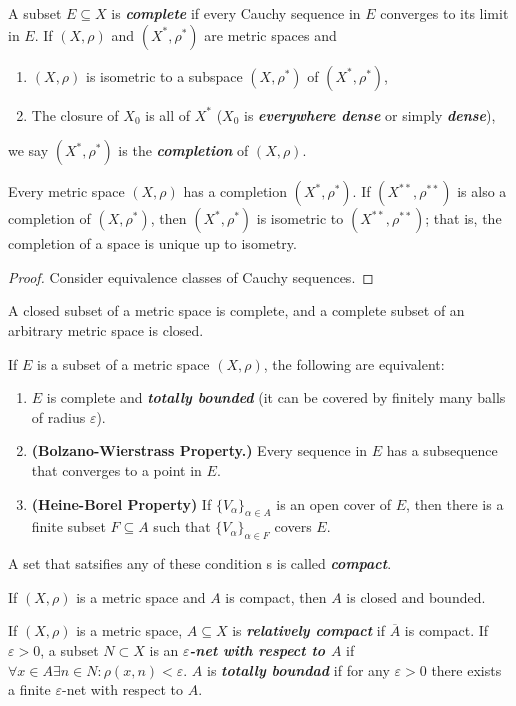 \documentclass{article}
\theoremstyle{definition}
\begin{document}
	A subset $E\subseteq X$ is \textbf{\textit{complete}} if every Cauchy sequence in $E$ converges to its limit in $E$. If $(X,\rho)$ and $(X^*,\rho^*)$ are metric spaces and
	\begin{enumerate}
		\item $(X,\rho)$ is isometric to a subspace $(X,\rho^*)$ of $(X^*,\rho^*)$,
		\item The closure of $X_0$ is all of $X^*$ ($X_0$ is \textbf{\textit{everywhere dense}} or simply \textbf{\textit{dense}}),
	\end{enumerate}
	we say $(X^*,\rho^*)$ is the \textbf{\textit{completion}} of $(X,\rho)$.
	\begin{thm}
		Every metric space $(X,\rho)$ has a completion $(X^*,\rho^*)$. If $(X^{**},\rho^{**})$ is also a completion of $(X,\rho^*)$, then $(X^*,\rho^*)$ is isometric to $(X^{**},\rho^{**})$; that is, the completion of a space is unique up to isometry.
	\end{thm}
	\begin{proof}
		Consider equivalence classes of Cauchy sequences.
	\end{proof}
	
	\begin{prop}
		A closed subset of a metric space is complete, and a complete subset of an arbitrary metric space is closed.
	\end{prop}
	
	\begin{thm}
		If $E$ is a subset of a metric space $(X,\rho)$, the following are equivalent:
		\begin{enumerate}
			\item $E$ is complete and \textbf{\textit{totally bounded}} (it can be covered by finitely many balls of radius $\varepsilon$).
			\item \textbf{(Bolzano-Wierstrass Property.)} Every sequence in $E$ has a subsequence that converges to a point in $E$.
			\item \textbf{(Heine-Borel Property)} If $\{V_\alpha\}_{\alpha\in A}$ is an open cover of $E$, then there is a finite subset $F\subseteq A$ such that $\{V_\alpha\}_{\alpha\in F}$ covers $E$.
		\end{enumerate}
		A set that satsifies any of these condition
		s is called \textbf{\textit{compact}}.
	\end{thm}
	\begin{thm}
		If $(X,\rho)$ is a metric space and $A$ is compact, then $A$ is closed and bounded.
	\end{thm}
	If $(X,\rho)$ is a metric space, $A\subseteq X$ is \textbf{\textit{relatively compact}} if $\overline{A}$ is compact. If $\varepsilon>0$, a subset $N\subset X$ is an \textbf{\textit{$\varepsilon$-net with respect to $A$}} if $\forall x\in A\exists n\in N:\rho(x,n)<\varepsilon$. $A$ is \textbf{\textit{totally boundad}} if for any $\varepsilon>0$ there exists a finite $\varepsilon$-net with respect to $A$.
	
\end{document}
